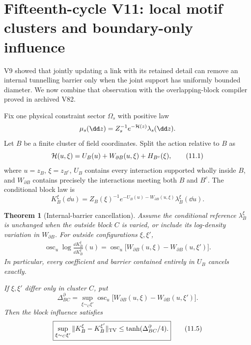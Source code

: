 \documentclass[11pt]{article}
\newtheorem{theorem}{Theorem}[section]
\theoremstyle{remark}
\begin{document}
\section{Fifteenth-cycle V11: local motif clusters and boundary-only influence}
\label{sec:v15v11}

V9 showed that jointly updating a link with its retained detail can
remove an internal tunnelling barrier only when the joint support
has uniformly bounded diameter.  We now combine that observation
with the overlapping-block compiler proved in archived V82.

Fix one physical constraint sector \(\Omega_s\) with positive law
\[
 \mu_s(\dd z)=Z_s^{-1}e^{-{\cal H}(z)}\lambda_s(\dd z).
\]
Let \(B\) be a finite cluster of field coordinates.  Split the
action relative to \(B\) as
\[
 {\cal H}(u,\xi)
 =U_B(u)+W_{\partial B}(u,\xi)+H_{B^c}(\xi),                 \tag{11.1}
\]
where \(u=z_B\), \(\xi=z_{B^c}\), \(U_B\) contains every
interaction supported wholly inside \(B\), and
\(W_{\partial B}\) contains precisely the interactions meeting
both \(B\) and \(B^c\).  The conditional block law is
\[
 K_B^\xi(\dd u)
 =Z_B(\xi)^{-1}
 e^{-U_B(u)-W_{\partial B}(u,\xi)}\lambda_B^\xi(\dd u).
                                                                  \tag{11.2}
\]

\begin{theorem}[Internal-barrier cancellation]
\label{thm:v15v11-barrier-cancel}
Assume the conditional reference \(\lambda_B^\xi\) is unchanged
when the outside block \(C\) is varied, or include its
log-density variation in \(W_{\partial B}\).  For outside
configurations \(\xi,\xi'\),
\[
 \begin{split}
 \operatorname{osc}_u
 \log\frac{\dd K_B^\xi}{\dd K_B^{\xi'}}(u)
 =
 \operatorname{osc}_u\bigl[
 W_{\partial B}(u,\xi)-W_{\partial B}(u,\xi')
 \bigr].                                                     \tag{11.3}
 \end{split}
\]
In particular, every coefficient and barrier contained entirely
in \(U_B\) cancels exactly.

If \(\xi,\xi'\) differ only in cluster \(C\), put
\[
 \Delta_{BC}^{\partial}
 =\sup_{\xi\sim_C\xi'}
 \operatorname{osc}_u\bigl[
 W_{\partial B}(u,\xi)-W_{\partial B}(u,\xi')
 \bigr].                                                     \tag{11.4}
\]
Then the block influence satisfies
\[
 \boxed{
 \sup_{\xi\sim_C\xi'}
 \|K_B^\xi-K_B^{\xi'}\|_{\rm TV}
 \le\tanh(\Delta_{BC}^{\partial}/4).}                        \tag{11.5}
\]
\end{theorem}
\end{document}
